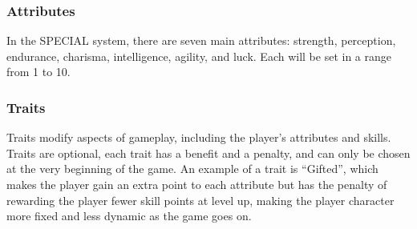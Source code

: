 

\subsubsection{Attributes}

In the SPECIAL system, there are seven main attributes: strength, perception, endurance, charisma, intelligence, agility, and luck. Each will be set in a range from 1 to 10. 

\subsubsection{Traits}

Traits modify aspects of gameplay, including the player's attributes and skills. Traits are optional, each trait has a benefit and a penalty, and can only be chosen at the very beginning of the game. An example of a trait is ``Gifted'', which makes the player gain an extra point to each attribute but has the penalty of rewarding the player fewer skill points at level up, making the player character more fixed and less dynamic as the game goes on.


